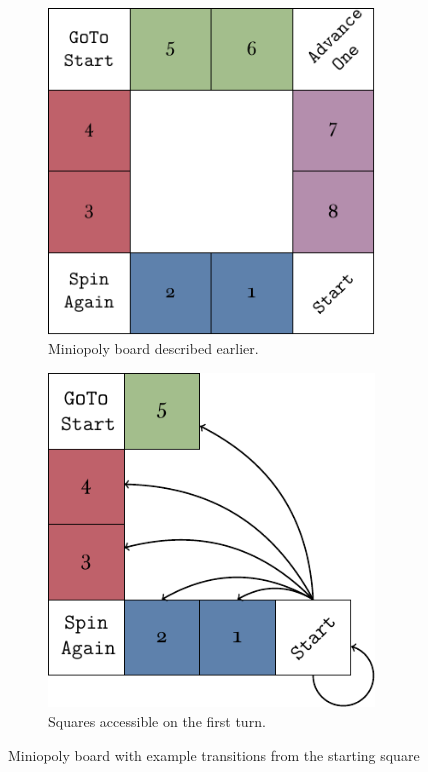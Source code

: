 \begin{figure}[h]
    \centering
	\begin{subfigure}[t]{0.35\textwidth}
		\centering
		\includegraphics[width=0.95\textwidth]{img/board.pdf}
		\caption{Miniopoly board described earlier.}
		\label{fig:miniopoly-board}
	\end{subfigure}
	\begin{subfigure}[t]{0.55\textwidth}
		\centering
		\includegraphics[width=0.95\textwidth]{img/diagram-start.pdf}
		\caption{Squares accessible on the first turn.}
		\label{fig:miniopoly-diagram-start}
	\end{subfigure}
    \caption{Miniopoly board with example transitions from the starting square}
    \label{figs:miniopoly-boards-transitions}
\end{figure}


